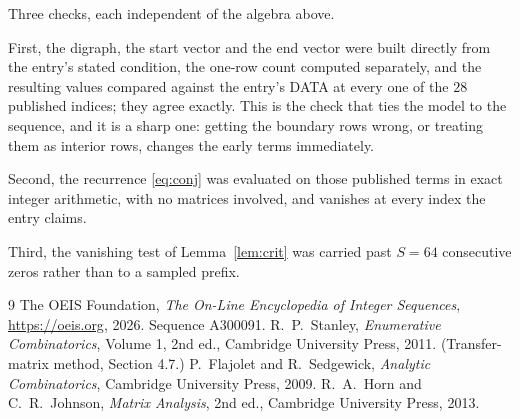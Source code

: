 \documentclass[11pt,a4paper]{article}
\theoremstyle{plain}
\theoremstyle{definition}
\begin{document}
Three checks, each independent of the algebra above.

First, the digraph, the start vector and the end vector were built directly from the
entry's stated condition, the one-row count computed separately, and the resulting values
compared against the entry's DATA at every one of the $28$ published indices; they
agree exactly. This is the check that ties the model to the sequence, and it is a sharp one:
getting the boundary rows wrong, or treating them as interior rows, changes the early terms
immediately.

Second, the recurrence \eqref{eq:conj} was evaluated on those published terms in exact
integer arithmetic, with no matrices involved, and vanishes at every index the entry claims.

Third, the vanishing test of Lemma~\ref{lem:crit} was carried past $S=64$ consecutive
zeros rather than to a sampled prefix.

\begin{thebibliography}{9}
 The OEIS Foundation, \emph{The On-Line Encyclopedia of Integer
Sequences}, \url{https://oeis.org}, 2026. Sequence A300091.
 R.~P.~Stanley, \emph{Enumerative Combinatorics}, Volume 1, 2nd ed.,
Cambridge University Press, 2011. (Transfer-matrix method, Section 4.7.)
 P.~Flajolet and R.~Sedgewick, \emph{Analytic Combinatorics}, Cambridge
University Press, 2009.
 R.~A.~Horn and C.~R.~Johnson, \emph{Matrix Analysis}, 2nd ed., Cambridge
University Press, 2013.
\end{thebibliography}
\end{document}
